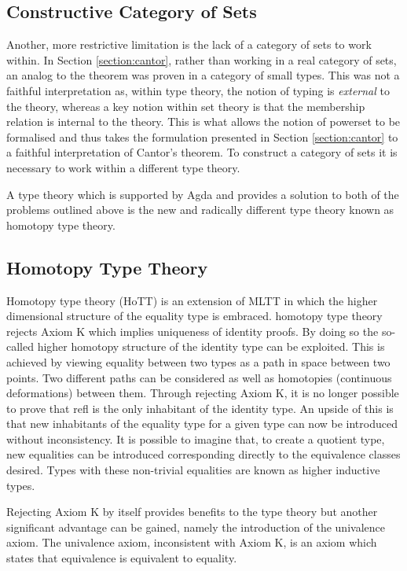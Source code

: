 \subsection{Constructive Category of Sets}
\label{section:sets}
Another, more restrictive limitation is the lack of a category of sets to work
within. In Section \ref{section:cantor}, rather than working in a
real category of sets, an analog to the theorem was proven in a category of
small types. This was not a faithful interpretation as, within type theory, the
notion of typing is \textit{external} to the theory, whereas a key notion within
set theory is that the membership relation is internal to the theory. This is
what allows the notion of powerset to be formalised and thus takes the
formulation presented in Section \ref{section:cantor} to a faithful
interpretation of Cantor's theorem. To construct a category of
sets it is necessary to work within a different type theory.

A type theory which is supported by Agda and provides a solution to both of the
problems outlined above is the new and radically different type theory known as
homotopy type theory.

\subsection{Homotopy Type Theory}
\label{section:hott}
Homotopy type theory (HoTT) \cite{hottbook} is an extension of MLTT in which the
higher dimensional structure of the equality type is embraced. homotopy type
theory rejects \textsf{Axiom K} which implies uniqueness of identity proofs. By doing so the so-called higher
homotopy structure of the identity type can be exploited. This is achieved by
viewing equality between two types as a path in space between two points. Two
different paths can be considered as well as homotopies (continuous
deformations) between them. Through rejecting \textsf{Axiom K}, it is no longer
possible to prove that \textsf{refl} is the only inhabitant of the identity
type. An upside of this is that new inhabitants of the equality type for a given
type can now be introduced without inconsistency. It is possible to imagine
that, to create a quotient type, new equalities can be introduced corresponding
directly to the equivalence classes desired. Types with these non-trivial
equalities are known as higher inductive types.

Rejecting \textsf{Axiom K} by itself provides benefits to the type theory but
another significant advantage can be gained, namely the introduction of the
univalence axiom. The univalence axiom, inconsistent with
\textsf{Axiom K}, is an axiom which states that equivalence is equivalent to
equality.

